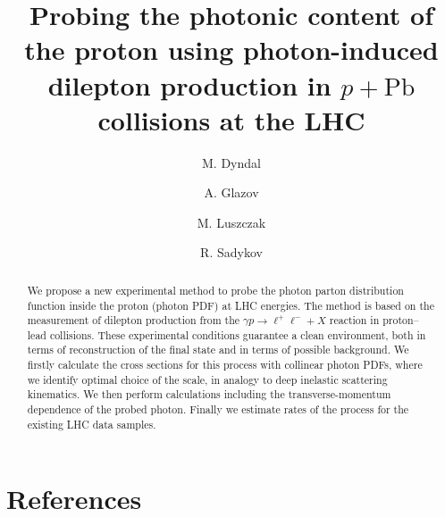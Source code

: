 \documentclass[preprint,12pt]{revtex4}
\begin{document}
\title{Probing the photonic content of the proton using photon-induced dilepton production in $p+\textrm{Pb}$ collisions at the LHC}


\author{M. Dyndal}
\address{Deutsches Elektronen-Synchrotron DESY, Hamburg, Germany}

\author{A. Glazov}
\address{Deutsches Elektronen-Synchrotron DESY, Hamburg, Germany}

\author{M. Luszczak}
\address{Faculty of Mathematics and Natural Sciences, University of Rzeszow, Poland}
\author{R. Sadykov}
\address{Joint Institute for Nuclear Research (JINR), Dubna, Russia}



\begin{abstract}
We propose a new experimental method to probe the photon parton distribution function inside the proton (photon PDF) at LHC energies.
The method is based on the measurement of dilepton production from the $\gamma p\rightarrow\ell^+\ell^-+X$ reaction in proton--lead collisions. These experimental conditions guarantee a clean environment, both in terms of reconstruction of the final state and in terms of possible background.
We firstly calculate the cross sections for this process with collinear photon PDFs, where we identify optimal choice of the scale, in analogy to deep inelastic scattering kinematics.
We then perform calculations including the transverse-momentum dependence of the probed photon.
Finally we estimate rates of the process for the existing LHC data samples.
\end{abstract}



\maketitle









\FloatBarrier




\section*{References}


\end{document}
